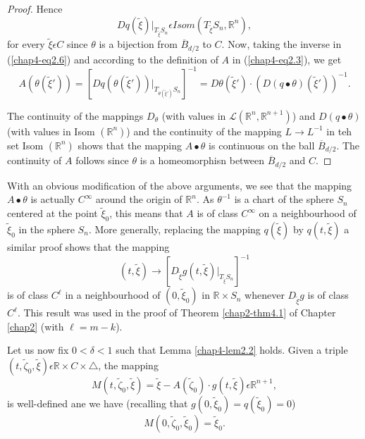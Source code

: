 \begin{proof}
Hence
$$
Dq(\widetilde{\xi}) |_{T_{\widetilde{\xi}}S_{n}} \epsilon Isom
(T_{\widetilde{\xi}} S_{n}, \mathbb{R}^{n}),
$$
for every $\widetilde{\xi} \epsilon C$ since $\theta$ is a bijection
from $\overline{B}_{d/2}$ to $C$. Now, taking the inverse in
(\ref{chap4-eq2.6}) and according to the definition of $A$ in
(\ref{chap4-eq2.3}), we get
$$
A(\theta(\widetilde{\xi}')) = [Dq(\theta(\widetilde{\xi}'))
  |_{T_{\theta(\widetilde{\xi}')}S_{n}}]^{-1} =
D\theta(\widetilde{\xi}') \cdot (D(q \bullet \theta) (\widetilde{\xi}'))^{-1}.
$$
 
The continuity of the mappings $D_{\theta}$ (with values in
$\mathscr{L}(\mathbb{R}^{n}, \mathbb{R}^{n+1})$) and $D(q \bullet
\theta)$\pageoriginale (with values in Isom $(\mathbb{R}^{n})$) and
the continuity of the mapping $L \to L^{-1}$ in teh set Isom
$(\mathbb{R}^{n})$ shows that the mapping $A \bullet \theta$ is
continuous on the ball $\overline{B}_{d/2}$. The continuity of $A$
follows since $\theta$ is a homeomorphisn between $\overline{B}_{d/2}$
and $C$.
\end{proof}

\begin{remark}\label{chap4-rem2.1}
With an obvious modification of the above arguments, we see that the
mapping $A \bullet \theta$ is actually $C^{\infty}$ around the origin
of $\mathbb{R}^{n}$. As $\theta^{-1}$ is a chart of the sphere $S_{n}$
centered at the point $\widetilde{\xi}_{0}$, this means that $A$ is of class
$C^{\infty}$ on a neighbourhood of $\widetilde{\xi}_{0}$ in the sphere
$S_{n}$. More generally, replacing the mapping $q(\widetilde{\xi})$ by
$q(t, \widetilde{\xi})$ a similar proof shows that the mapping
$$
(t, \widetilde{\xi}) \to [D_{\widetilde{\xi}}g (t, \widetilde{\xi}) |_{T_{\widetilde{\xi}}S_{n}}]^{-1}
$$
is of class $C^{\ell}$ in a neighbourhood of $(0,
\widetilde{\xi}_{0})$ in $\mathbb{R} \times S_{n}$ whenever
$D_{\widetilde{\xi}}g$ is of class $C^{\ell}$. This result was used in
the proof of Theorem \ref{chap2-thm4.1} of Chapter \ref{chap2} (with
$\ell = m-k$).
\end{remark}

Let us now fix $0 < \delta < 1$ such that Lemma \ref{chap4-lem2.2}
holds. Given a triple $(t, \widetilde{\zeta}_{0}, \widetilde{\xi})
\epsilon \mathbb{R} \times C \times \triangle$, the mapping
\begin{equation*}
M(t, \widetilde{\zeta}_{0}, \widetilde{\xi}) = \widetilde{\xi} -
A(\widetilde{\zeta}_{0}) \cdot g(t, \widetilde{\xi}) \epsilon \mathbb{R}^{n+1},\tag{2.7}\label{chap4-eq2.7}
\end{equation*}
is well-defined ane we have (recalling that $g(0, \widetilde{\xi}_{0})
= q(\widetilde{\xi}_{0}) = 0$)
\begin{equation*}
M(0, \widetilde{\zeta}_{0}, \widetilde{\xi}_{0}) = \widetilde{\xi}_{0}.\tag{2.8}\label{chap4-eq2.8}
\end{equation*}


